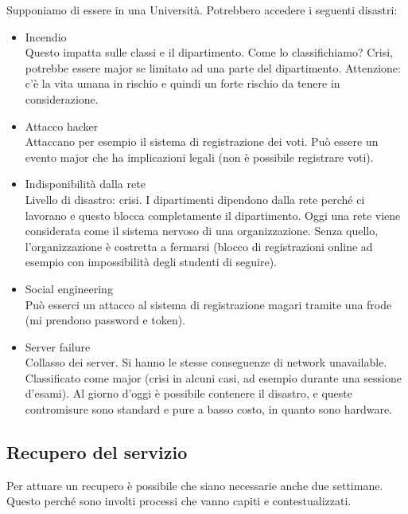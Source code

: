 Supponiamo di essere in una Universit\`a.
Potrebbero accedere i seguenti disastri:
\begin{itemize}
 \item Incendio \\
 Questo impatta sulle classi e il dipartimento. Come lo 
classifichiamo? Crisi, potrebbe essere major se limitato ad una parte del 
dipartimento. Attenzione: c'è la vita umana in rischio e quindi un forte 
rischio da tenere in considerazione.

 \item Attacco hacker \\
 Attaccano per esempio il sistema di registrazione dei voti. Può essere un 
evento major che ha implicazioni legali (non \`e possibile registrare voti).

 \item Indisponibilità dalla rete \\
 Livello di disastro: crisi. I dipartimenti dipendono dalla rete perché 
ci lavorano e questo blocca completamente il dipartimento. Oggi una rete viene 
considerata come il sistema nervoso di una organizzazione. Senza quello, 
l'organizzazione \`e costretta a fermarsi (blocco di registrazioni online ad 
esempio con impossibilit\`a degli studenti di seguire).

 \item Social engineering \\
 Può esserci un attacco al sistema di registrazione magari tramite una frode 
(mi prendono password e token).

 \item Server failure \\
 Collasso dei server. Si hanno le stesse conseguenze di network unavailable. 
Classificato come major (crisi in alcuni casi, ad esempio durante una sessione 
d'esami). Al giorno d'oggi \`e possibile contenere il disastro, e queste 
contromisure sono standard e pure a basso costo, in quanto sono hardware.
\end{itemize}

\subsection{Recupero del servizio}

Per attuare un recupero \`e possibile che siano necessarie anche due settimane. 
Questo perché sono involti processi che vanno capiti e contestualizzati.



